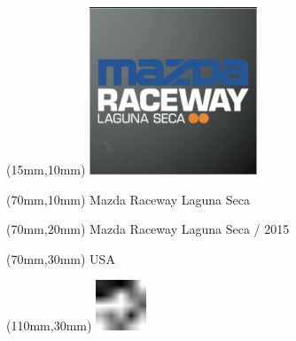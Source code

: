 \null\newpage
\begin{textblock*}{50mm}(15mm,10mm)%
\includegraphics[width=50mm]{LG/2015-05-20_00085.png}
\end{textblock*}
\begin{textblock*}{130mm}(70mm,10mm)%
{\fontsize{20}{20}\selectfont Mazda Raceway Laguna Seca}\\
\end{textblock*}
\begin{textblock*}{120mm}(70mm,20mm)%
{\fontsize{16}{16}\selectfont Mazda Raceway Laguna Seca / 2015}\\
\end{textblock*}
\begin{textblock*}{120mm}(70mm,30mm)%
{\fontsize{12}{12}\selectfont USA}
\end{textblock*}
\begin{textblock*}{30mm}(110mm,30mm)%
\centering
\includegraphics[height=15mm]{icons/fa-rotate-left.pdf}
\end{textblock*}
